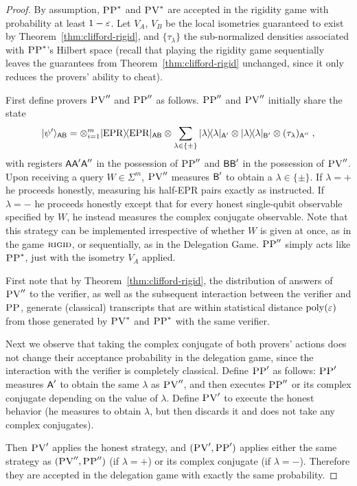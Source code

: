 \begin{proof}
By assumption, $\textsc{PP}^*$ and $\textsc{PV}^*$ are accepted in the rigidity game with
  probability at least $1-\varepsilon$. Let $V_A$, $V_B$ be the local isometries
  guaranteed to exist by Theorem~\ref{thm:clifford-rigid}, and
  $\{\tau_\lambda\}$ the sub-normalized densities associated with $\textsc{PP}^*$'s
  Hilbert space (recall that playing the rigidity game sequentially leaves the
  guarantees from Theorem~\ref{thm:clifford-rigid} unchanged, since it only reduces the provers' ability to cheat).

First define provers $\textsc{PV}''$ and $\textsc{PP}''$ as follows. $\textsc{PP}''$ and $\textsc{PV}''$ initially share the state 
$$|\psi'\rangle_{{\textsf{AB}}} = \otimes_{i=1}^{m} |{\rm EPR}\rangle\!\langle{\rm EPR}|_{{\textsf{AB}}} \otimes \sum_{\lambda\in\{\pm\}}  |\lambda\rangle\!\langle\lambda|_{{\textsf{A}}'}\otimes |\lambda\rangle\!\langle\lambda|_{{\textsf{B}}'}\otimes (\tau_\lambda)_{{\textsf{A}}''}\;,$$
with registers ${\textsf{A}}{\textsf{A}}'{\textsf{A}}''$ in the possession of $\textsc{PP}''$ and ${\textsf{BB}}'$ in the possession of $\textsc{PV}''$. 
Upon receiving a query $W\in \Sigma^m$, $\textsc{PV}''$ measures ${\textsf{B}}'$ to obtain a $\lambda\in\{\pm\}$. If $\lambda=+$ he proceeds honestly, measuring his half-EPR pairs exactly as instructed. If $\lambda=-$ he proceeds honestly except that for every honest single-qubit observable specified by $W$, he instead measures the complex conjugate observable. Note that this strategy can be implemented irrespective of whether $W$ is given at once, as in the game $\textsc{rigid}$, or sequentially, as in the Delegation Game. $\textsc{PP}''$ simply acts like $\textsc{PP}^*$, just with the isometry $V_A$ applied. 

First note that by Theorem~\ref{thm:clifford-rigid}, the distribution of answers of $\textsc{PV}''$ to the verifier, as well as the subsequent interaction between the verifier and $\textsc{PP}$, generate (classical) transcripts that are within statistical distance $\operatorname{poly}(\varepsilon)$ from those generated by $\textsc{PV}^*$ and $\textsc{PP}^*$ with the same verifier. 

Next we observe that taking the complex conjugate of both provers' actions does not change their acceptance probability in the delegation game, since the interaction with the verifier is completely classical. Define $\textsc{PP}'$ as follows: $\textsc{PP}'$ measures ${\textsf{A}}'$ to obtain the same $\lambda$ as $\textsc{PV}''$, and then executes $\textsc{PP}''$ or its complex conjugate depending on the value of $\lambda$. Define $\textsc{PV}'$ to execute the honest behavior (he measures to obtain $\lambda$, but then discards it and does not take any complex conjugates). 

Then $\textsc{PV}'$ applies the honest strategy, and $(\textsc{PV}',\textsc{PP}')$ applies either the same strategy as $(\textsc{PV}'',\textsc{PP}'')$ (if $\lambda=+$) or its complex conjugate (if $\lambda=-$). Therefore they are accepted in the delegation game with exactly the same probability. 
\end{proof}

